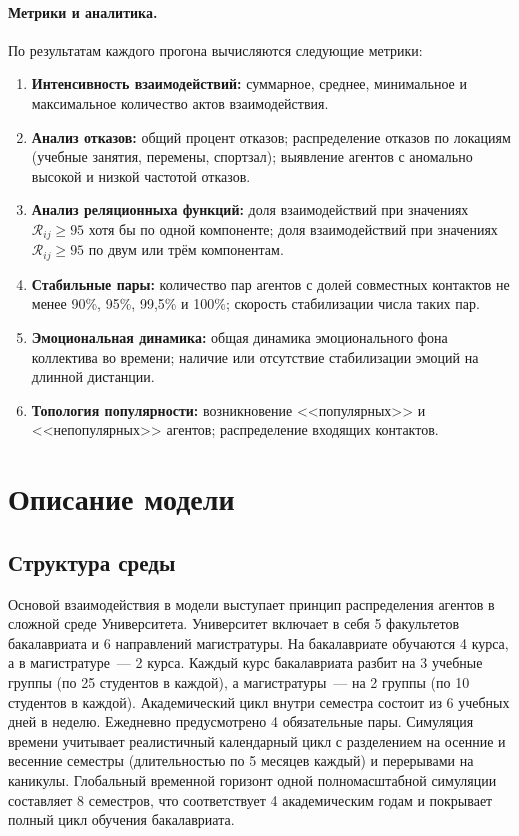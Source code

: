 \documentclass[12pt]{article}
\begin{document}
\paragraph{Метрики и аналитика.}
По результатам каждого прогона вычисляются следующие метрики:
\begin{enumerate}
    \item \textbf{Интенсивность взаимодействий:} суммарное, среднее, минимальное и максимальное количество актов взаимодействия.
    \item \textbf{Анализ отказов:} общий процент отказов; распределение отказов по локациям (учебные занятия, перемены, спортзал); выявление агентов с аномально высокой и низкой частотой отказов.
    \item \textbf{Анализ реляционныха функций:} доля взаимодействий при значениях $\mathcal{R}_{ij} \geq 95$ хотя бы по одной компоненте; доля взаимодействий при значениях $\mathcal{R}_{ij} \geq 95$ по двум или трём компонентам.
    \item \textbf{Стабильные пары:} количество пар агентов с долей совместных контактов не менее 90\%, 95\%, 99{,}5\% и 100\%; скорость стабилизации числа таких пар.
    \item \textbf{Эмоциональная динамика:} общая динамика эмоционального фона коллектива во времени; наличие или отсутствие стабилизации эмоций на длинной дистанции.
    \item \textbf{Топология популярности:} возникновение <<популярных>> и <<непопулярных>> агентов; распределение входящих контактов.
\end{enumerate}

\clearpage
\section{Описание модели}

\subsection{Структура среды}

Основой взаимодействия в модели выступает принцип распределения агентов в сложной среде Университета. Университет включает в себя 5 факультетов бакалавриата и 6 направлений магистратуры. На бакалавриате обучаются 4 курса, а в магистратуре~--- 2 курса. Каждый курс бакалавриата разбит на 3 учебные группы (по 25 студентов в каждой), а магистратуры~--- на 2 группы (по 10 студентов в каждой). Академический цикл внутри семестра состоит из 6 учебных дней в неделю. Ежедневно предусмотрено 4 обязательные пары. Симуляция времени учитывает реалистичный календарный цикл с разделением на осенние и весенние семестры (длительностью по 5 месяцев каждый) и перерывами на каникулы. Глобальный временной горизонт одной полномасштабной симуляции составляет 8 семестров, что соответствует 4 академическим годам и покрывает полный цикл обучения бакалавриата.
\end{document}
